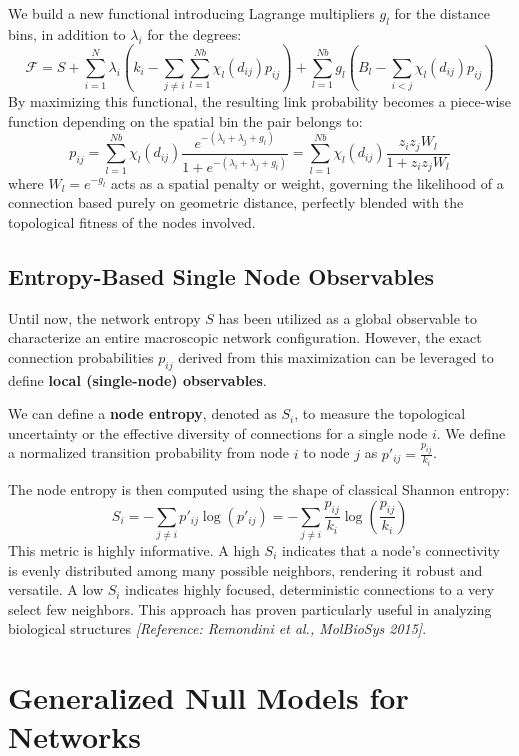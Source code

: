 We build a new functional introducing Lagrange multipliers \(g_l\) for the distance bins, in addition to \(\lambda_i\) for the degrees:
\[
    \mathcal{F} = S + \sum_{i=1}^N \lambda_i \left( k_i - \sum_{j \neq i} \sum_{l=1}^{Nb} \chi_l(d_{ij}) p_{ij} \right) + \sum_{l=1}^{Nb} g_l \left( B_l - \sum_{i<j} \chi_l(d_{ij}) p_{ij} \right)
\]
By maximizing this functional, the resulting link probability becomes a piece-wise function depending on the spatial bin the pair belongs to:
\[
    p_{ij} = \sum_{l=1}^{Nb} \chi_l(d_{ij}) \frac{e^{-(\lambda_i + \lambda_j + g_l)}}{1 + e^{-(\lambda_i + \lambda_j + g_l)}} = \sum_{l=1}^{Nb} \chi_l(d_{ij}) \frac{z_i z_j W_l}{1 + z_i z_j W_l}
\]
where \(W_l = e^{-g_l}\) acts as a spatial penalty or weight, governing the likelihood of a connection based purely on geometric distance, perfectly blended with the topological fitness of the nodes involved.

\subsection{Entropy-Based Single Node Observables}
\label{subsec:entropy_based_observables}

Until now, the network entropy \(S\) has been utilized as a global observable to characterize an entire macroscopic network configuration. However, the exact connection probabilities \(p_{ij}\) derived from this maximization can be leveraged to define \textbf{local (single-node) observables}.

We can define a \textbf{node entropy}, denoted as \(S_i\), to measure the topological uncertainty or the effective diversity of connections for a single node \(i\). We define a normalized transition probability from node \(i\) to node \(j\) as \(p'_{ij} = \frac{p_{ij}}{k_i}\).

The node entropy is then computed using the shape of classical Shannon entropy:
\[
    S_i = - \sum_{j \neq i} p'_{ij} \log(p'_{ij}) = - \sum_{j \neq i} \frac{p_{ij}}{k_i} \log \left( \frac{p_{ij}}{k_i} \right)
\]
This metric is highly informative. A high \(S_i\) indicates that a node's connectivity is evenly distributed among many possible neighbors, rendering it robust and versatile. A low \(S_i\) indicates highly focused, deterministic connections to a very select few neighbors. This approach has proven particularly useful in analyzing biological structures \textit{[Reference: Remondini et al., MolBioSys 2015]}.

\section{Generalized Null Models for Networks}
\label{sec:generalized_null_models}

